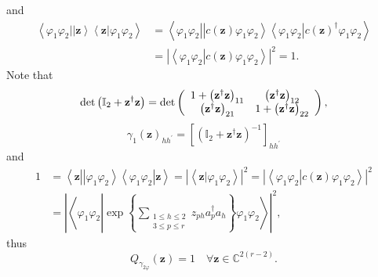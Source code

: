 \documentclass[aps,preprint]{revtex4}%
\begin{document}
and%
\begin{align}
\left\langle \varphi_{1}\varphi_{2}\left\vert \left\vert \mathbf{z}%
\right\rangle \left\langle \mathbf{z}\right\vert \right.  \varphi_{1}%
\varphi_{2}\right\rangle  &  =\left\langle \varphi_{1}\varphi_{2}\left\vert
\left\vert c\left(  \mathbf{z}\right)  \varphi_{1}\varphi_{2}\right\rangle
\left\langle \varphi_{1}\varphi_{2}\right\vert \right.  c\left(
\mathbf{z}\right)  ^{\dagger}\varphi_{1}\varphi_{2}\right\rangle \nonumber\\
&  =\left\vert \left\langle \varphi_{1}\varphi_{2}\left\vert c\left(
\mathbf{z}\right)  \varphi_{1}\varphi_{2}\right.  \right\rangle \right\vert
^{2}=1.
\end{align}
Note that%
\begin{equation}
\det\left(  \mathbb{I}_{2}+\mathbf{z}^{\dagger}\mathbf{z}\right)  =\det\left(
%
\begin{array}
[c]{cc}%
1+\left(  \mathbf{z}^{\dagger}\mathbf{z}\right)  _{11} & \left(
\mathbf{z}^{\dagger}\mathbf{z}\right)  _{12}\\
\left(  \mathbf{z}^{\dagger}\mathbf{z}\right)  _{21} & 1+\left(
\mathbf{z}^{\dagger}\mathbf{z}\right)  _{22}%
\end{array}
\right)  ,
\end{equation}%
\begin{equation}
\gamma_{1}\left(  \mathbf{z}\right)  _{hh^{\prime}}=\left[  \left(
\mathbb{I}_{2}+\mathbf{z}^{\dagger}\mathbf{z}\right)  ^{-1}\right]
_{hh^{\prime}}%
\end{equation}
and
\begin{align}
1  &  =\left\langle \mathbf{z}\left\vert \left\vert \varphi_{1}\varphi
_{2}\right\rangle \left\langle \varphi_{1}\varphi_{2}\right\vert \right.
\mathbf{z}\right\rangle =\left\vert \left\langle \left.  \mathbf{z}\right\vert
\varphi_{1}\varphi_{2}\right\rangle \right\vert ^{2}=\left\vert \left\langle
\left.  \varphi_{1}\varphi_{2}\right\vert c\left(  \mathbf{z}\right)
\varphi_{1}\varphi_{2}\right\rangle \right\vert ^{2}\nonumber\\
&  =\left\vert \left\langle \varphi_{1}\varphi_{2}\left\vert \exp\left\{
\sum\limits_{\substack{1\leq h\leq2\\3\leq p\leq r}}z_{ph}a_{p}^{\dagger}%
a_{h}\right\}  \varphi_{1}\varphi_{2}\right.  \right\rangle \right\vert ^{2},
\end{align}
thus
\begin{equation}
Q_{\gamma_{2\varphi}}\left(  \mathbf{z}\right)  =1\quad\forall\mathbf{z\in
}\mathbb{C}^{2\left(  r-2\right)  }.
\end{equation}
\end{document}
